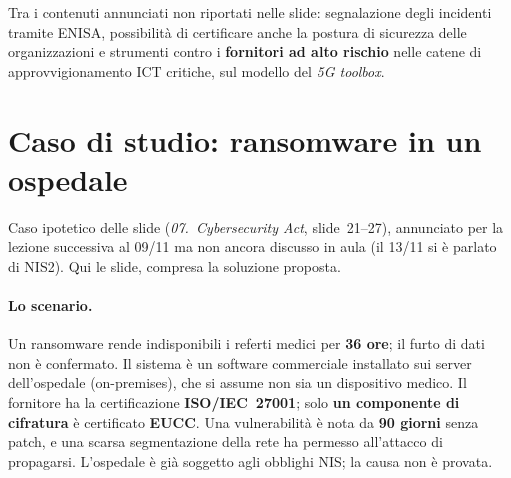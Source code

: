 \begin{integrazione}[La proposta]
Tra i contenuti annunciati non riportati nelle slide: segnalazione degli incidenti tramite ENISA,
possibilità di certificare anche la postura di sicurezza delle organizzazioni e strumenti contro i
\textbf{fornitori ad alto rischio} nelle catene di approvvigionamento ICT critiche, sul modello del
\emph{5G toolbox}.
\end{integrazione}

\section{Caso di studio: ransomware in un ospedale}
\label{sec:csa-caso}

\begin{nota}[Fonte]
Caso ipotetico delle slide (\emph{07.\ Cybersecurity Act}, slide~21--27), annunciato per la lezione
successiva al 09/11 ma non ancora discusso in aula (il 13/11 si è parlato di NIS2). Qui le slide,
compresa la soluzione proposta.
\end{nota}

\paragraph{Lo scenario.} Un ransomware rende indisponibili i referti medici per \textbf{36 ore}; il furto
di dati non è confermato. Il sistema è un software commerciale installato sui server dell'ospedale
(on-premises), che si assume non sia un dispositivo medico. Il fornitore ha la certificazione
\textbf{ISO/IEC~27001}; solo \textbf{un componente di cifratura} è certificato \textbf{EUCC}. Una
vulnerabilità è nota da \textbf{90 giorni} senza patch, e una scarsa segmentazione della rete ha
permesso all'attacco di propagarsi. L'ospedale è già soggetto agli obblighi NIS; la causa non è
provata.

